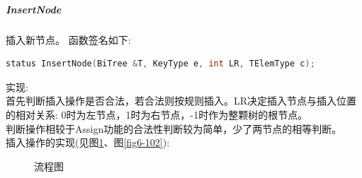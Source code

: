 \documentclass[supercite]{Experimental_Report}
\theoremstyle{definition}
\begin{document}
\subparagraph{InsertNode}
\noindent
插入新节点。
函数签名如下:
\begin{lstlisting}[language=C++, frame=single]
status InsertNode(BiTree &T, KeyType e, int LR, TElemType c);
\end{lstlisting}
实现: \\
首先判断插入操作是否合法，若合法则按规则插入。LR决定插入节点与插入位置的相对关系: 0时为左节点，1时为右节点，-1时作为整颗树的根节点。\\
判断操作相较于Assign功能的合法性判断较为简单，少了两节点的相等判断。 \\
插入操作的实现(见图\ref{fig6-101}、图\ref{fig6-102}):
\begin{figure}[H]
	\centering
	\centering
	\caption{流程图}
	\label{fig6-101}
\end{figure}
\end{document}
